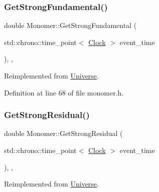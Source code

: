 \mbox{\label{class_monomer_a4bc8b39086260e26a196b28b4fc6667f}} 
\subsubsection{\texorpdfstring{Get\+Strong\+Fundamental()}{GetStrongFundamental()}}
{\footnotesize\ttfamily double Monomer\+::\+Get\+Strong\+Fundamental (\begin{DoxyParamCaption}\item[{std\+::chrono\+::time\+\_\+point$<$ \mbox{\hyperlink{universe_8h_a0ef8d951d1ca5ab3cfaf7ab4c7a6fd80}{Clock}} $>$}]{event\+\_\+time }\end{DoxyParamCaption})\hspace{0.3cm}{\ttfamily [inline]}, {\ttfamily [final]}, {\ttfamily [virtual]}}



Reimplemented from \mbox{\hyperlink{class_universe_ab44daccba01ee7e3cf9b50bba83dd19e}{Universe}}.



Definition at line 68 of file monomer.\+h.

\mbox{\label{class_monomer_a3b00168520f592098356f7cd3e663ad3}} 
\subsubsection{\texorpdfstring{Get\+Strong\+Residual()}{GetStrongResidual()}}
{\footnotesize\ttfamily double Monomer\+::\+Get\+Strong\+Residual (\begin{DoxyParamCaption}\item[{std\+::chrono\+::time\+\_\+point$<$ \mbox{\hyperlink{universe_8h_a0ef8d951d1ca5ab3cfaf7ab4c7a6fd80}{Clock}} $>$}]{event\+\_\+time }\end{DoxyParamCaption})\hspace{0.3cm}{\ttfamily [inline]}, {\ttfamily [final]}, {\ttfamily [virtual]}}



Reimplemented from \mbox{\hyperlink{class_universe_af0f4b81950061e63c2855eb40957a5b1}{Universe}}.



